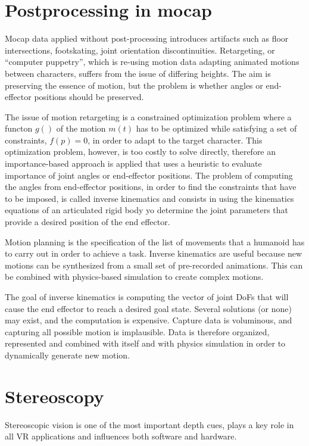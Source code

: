 \documentclass[a4paper]{article}
\begin{document}
\section{Postprocessing in mocap}

Mocap data applied without post-processing introduces artifacts such as
floor intersections, footskating, joint orientation discontinuities.
Retargeting, or ``computer puppetry'', which is re-using motion data
adapting animated motions between characters, suffers from the issue of
differing heights. The aim is preserving the essence of motion, but the
problem is whether angles or end-effector positions should be preserved.

The issue of motion retargeting is a constrained optimization problem
where a functon \(g()\) of the motion \(m(t)\) has to be optimized while
satisfying a set of constraints, \(f(p) = 0\), in order to adapt to the
target character. This optimization problem, however, is too costly to
solve directly, therefore an importance-based approach is applied that
uses a heuristic to evaluate importance of joint angles or end-effector
positions. The problem of computing the angles from end-effector
positions, in order to find the constraints that have to be imposed, is
called inverse kinematics and consists in using the kinematics equations
of an articulated rigid body yo determine the joint parameters that
provide a desired position of the end effector.

Motion planning is the specification of the list of movements that a
humanoid has to carry out in order to achieve a task. Inverse kinematics
are useful because new motions can be synthesized from a small set of
pre-recorded animations. This can be combined with physics-based
simulation to create complex motions.

The goal of inverse kinematics is computing the vector of joint DoFs
that will cause the end effector to reach a desired goal state. Several
solutions (or none) may exist, and the computation is expensive. Capture
data is voluminous, and capturing all possible motion is implausible.
Data is therefore organized, represented and combined with itself and
with physics simulation in order to dynamically generate new motion.


\section{Stereoscopy}

Stereoscopic vision is one of the most important depth cues, plays a key
role in all VR applications and influences both software and hardware.
\end{document}

